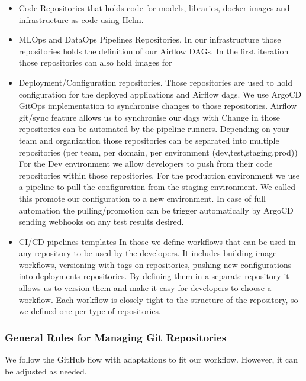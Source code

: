 \begin{itemize}
    \item Code Repositories that holds code for models, libraries, docker images and infrastructure as code using Helm.
    \item MLOps and DataOps Pipelines Repositories.
    In our infrastructure those repositories holds the definition of our Airflow DAGs.
    In the first iteration those repositories can also hold images for
    \item Deployment/Configuration repositories.
    Those repositories are used to hold configuration for the deployed applications and Airflow dags.
    We use ArgoCD GitOps implementation to synchronise changes to those repositories.
    Airflow git/sync feature allows us to synchronise our dags with
    Change in those repositories can be automated by the pipeline runners.
    Depending on your team and organization those repositories can be separated into multiple repositories (per team, per domain, per environment (dev,test,staging,prod))
    For the Dev environment we allow developers to push from their code repositories within those repositories.
    For the production environment we use a pipeline to pull the configuration from the staging environment.
    We called this promote our configuration to a new environment.
    In case of full automation the pulling/promotion can be trigger automatically by ArgoCD sending webhooks on any test results desired.
    \item CI/CD pipelines templates
    In those we define workflows that can be used in any repository to be used by the developers.
    It includes building image workflows, versioning with tags on repositories, pushing new configurations into deployments repositories.
    By defining them in a separate repository it allows us to version them and make it easy for developers to choose a workflow.
    Each workflow is closely tight to the structure of the repository, so we defined one per type of repositories.
\end{itemize}

\subsubsection{General Rules for Managing Git Repositories}
We follow the GitHub flow with adaptations to fit our workflow. However, it can be adjusted as needed.

